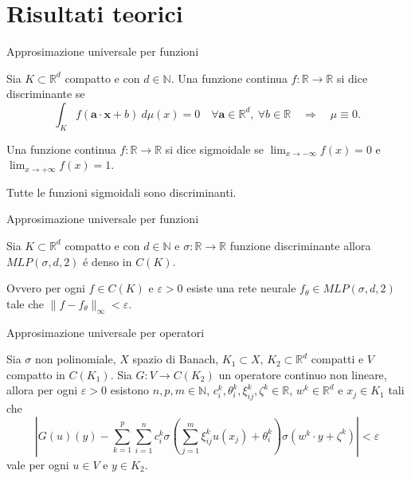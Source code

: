 \documentclass[aspectratio=169]{beamer}
\newcommand{\numberset}{\mathbb}
\newcommand{\N}{\numberset{N}}
\newcommand{\R}{\numberset{R}}
\begin{document}
\section{Risultati teorici}
\sectionpage

\begin{frame}{Approsimazione universale per funzioni}
    \begin{definition}
        Sia $K \subset \R^{d}$ compatto e con $d \in \N$. Una funzione continua $f: \R \to \R$ si dice discriminante se
        \[
            \int_{K} f(\textbf{a}\cdot \textbf{x} +b) \ d\mu(x) = 0 \quad \forall \textbf{a} \in \R^{d},\ \forall b \in \R \quad \Rightarrow \quad \mu \equiv 0.
        \]
    \end{definition}
    \pause
    \begin{definition}
        Una funzione continua $f: \R \to \R$ si dice sigmoidale se $ \lim_{x \to -\infty} f(x) = 0$ e $\lim_{x \to +\infty} f(x) = 1$.
    \end{definition}
    \pause
    Tutte le funzioni sigmoidali sono discriminanti.
\end{frame}

\begin{frame}{Approsimazione universale per funzioni}
    \begin{theorem}
        Sia $K \subset \R^{d}$ compatto e con $d \in \N$ e $\sigma: \R \to \R$ funzione discriminante allora $MLP(\sigma, d, 2)$ \'e denso in $C(K)$.
    \end{theorem}
    Ovvero per ogni $f \in C(K)$ e $\varepsilon > 0$ esiste una rete neurale $f_{\theta} \in MLP(\sigma, d, 2)$ tale che $\|f - f_{\theta}\|_{\infty} < \varepsilon$.
\end{frame}

\begin{frame}{Approsimazione universale per operatori}
    \begin{theorem}
        Sia $\sigma$ non polinomiale, $X$ spazio di Banach, $ K_1 \subset X $, $ K_2 \subset \R^d $ compatti e $ V $ compatto in $ C(K_1) $. Sia $ G: V \to C(K_2) $ un operatore continuo non lineare, allora per ogni $ \varepsilon > 0 $ esistono $ n, p, m \in \N $, $ c_i^k, \theta_i^k, \xi_{ij}^k, \zeta^k \in \R $, $ w^k \in \R^d $ e $ x_j \in K_1 $ tali che
        \[ \left| G(u)(y) - \sum_{k=1}^{p}\sum_{i=1}^{n}c_i^k \sigma \left( \sum_{j=1}^{m} \xi_{ij}^k u(x_j) + \theta_i^k \right) \sigma(w^k \cdot y + \zeta^k) \right| < \varepsilon  \]
        vale per ogni $ u \in V $ e $ y \in K_2 $.
    \end{theorem}
\end{frame}
\end{document}

